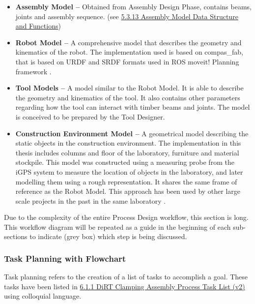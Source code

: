 \begin{itemize}
	\item \textbf{Assembly Model --} Obtained from Assembly Design Phase, contains beams, joints and assembly sequence. (see \ul{5.3.13 Assembly Model Data Structure and Functions})

	\item \textbf{Robot Model --} A comprehensive model that describes the geometry and kinematics of the robot. The implementation used is based on compas\_fab, that is based on URDF and SRDF formats used in ROS moveit! Planning framework \parencite{SrdfROSWiki2023, UrdfROSWiki2023}.

	\item \textbf{Tool Models --} A model similar to the Robot Model. It is able to describe the geometry and kinematics of the tool. It also contains other parameters regarding how the tool can interact with timber beams and joints. The model is conceived to be prepared by the Tool Designer.

	\item \textbf{Construction Environment Model --} A geometrical model describing the static objects in the construction environment. The implementation in this thesis includes columns and floor of the laboratory, furniture and material stockpile. This model was constructed using a measuring probe from the iGPS system to measure the location of objects in the laboratory, and later modelling them using a rough representation. It shares the same frame of reference as the Robot Model. This approach has been used by other large scale projects in the past in the same laboratory \parencite{thomaRoboticFabricationBespoke2018}.

\end{itemize}
Due to the complexity of the entire Process Design workflow, this section is long. This workflow diagram will be repeated as a guide in the beginning of each sub-sections to indicate (grey box) which step is being discussed.

\subsubsection{Task Planning with Flowchart}
\label{subsubsection:exploration_3_task_planning_with_flowchart}

Task planning refers to the creation of a list of tasks to accomplish a goal. These tasks have been listed in \ul{6.1.1 DiRT Clamping Assembly Process Task List (v2)} using colloquial language.

